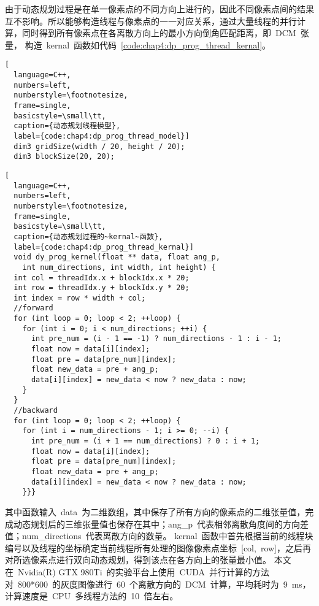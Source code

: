 由于动态规划过程是在单一像素点的不同方向上进行的，因此不同像素点间的结果互不影响。所以能够构造线程与像素点的一一对应关系，通过大量线程的并行计算，同时得到所有像素点在各离散方向上的最小方向倒角匹配距离，即~DCM~张量，
构造~kernal~函数如代码~\ref{code:chap4:dp_prog_thread_kernal}。
\begin{lstlisting}[
  language=C++,
  numbers=left,                
  numberstyle=\footnotesize,
  frame=single,     
  basicstyle=\small\tt,    
  caption={动态规划线程模型},
  label={code:chap4:dp_prog_thread_model}]
  dim3 gridSize(width / 20, height / 20);
  dim3 blockSize(20, 20);
  \end{lstlisting}
\begin{lstlisting}[
  language=C++,
  numbers=left,                
  numberstyle=\footnotesize,
  frame=single,     
  basicstyle=\small\tt,    
  caption={动态规划过程的~kernal~函数},
  label={code:chap4:dp_prog_thread_kernal}]
  void dy_prog_kernel(float ** data, float ang_p, 
    int num_directions, int width, int height) {
  int col = threadIdx.x + blockIdx.x * 20;
  int row = threadIdx.y + blockIdx.y * 20;
  int index = row * width + col;
  //forward
  for (int loop = 0; loop < 2; ++loop) {
    for (int i = 0; i < num_directions; ++i) {
      int pre_num = (i - 1 == -1) ? num_directions - 1 : i - 1;
      float now = data[i][index];
      float pre = data[pre_num][index];
      float new_data = pre + ang_p;
      data[i][index] = new_data < now ? new_data : now;
    }
  }
  //backward
  for (int loop = 0; loop < 2; ++loop) {
    for (int i = num_directions - 1; i >= 0; --i) {
      int pre_num = (i + 1 == num_directions) ? 0 : i + 1;
      float now = data[i][index];
      float pre = data[pre_num][index];
      float new_data = pre + ang_p;
      data[i][index] = new_data < now ? new_data : now;
    }}}
  \end{lstlisting}

其中函数输入~data~为二维数组，其中保存了所有方向的像素点的二维张量值，完成动态规划后的三维张量值也保存在其中；ang\_p~代表相邻离散角度间的方向差值；num\_directions~代表离散方向的数量。
kernal~函数中首先根据当前的线程块编号以及线程的坐标确定当前线程所有处理的图像像素点坐标~[col,~row]，之后再对所选像素点进行双向动态规划，得到该点在各方向上的张量最小值。
本文在~Nvidia(R) GTX 980Ti~的实验平台上使用~CUDA~并行计算的方法对~800*600~的灰度图像进行~60~个离散方向的~DCM~计算，平均耗时为~9~ms，计算速度是~CPU~多线程方法的~10~倍左右。

